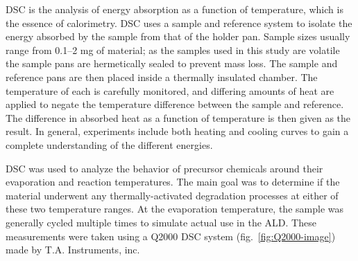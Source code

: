 DSC is the analysis of energy absorption as a function of temperature, which is the essence of calorimetry. DSC uses a sample and reference system to isolate the energy absorbed by the sample from that of the holder pan. Sample sizes usually range from 0.1--2 mg of material; as the samples used in this study are volatile the sample pans are hermetically sealed to prevent mass loss. The sample and reference pans are then placed inside a thermally insulated chamber. The temperature of each is carefully monitored, and differing amounts of heat are applied to negate the temperature difference between the sample and reference. The difference in absorbed heat as a function of temperature is then given as the result. In general, experiments include both heating and cooling curves to gain a complete understanding of the different energies. 
	
DSC was used to analyze the behavior of precursor chemicals around their evaporation and reaction temperatures. The main goal was to determine if the material underwent any thermally-activated degradation processes at either of these two temperature ranges. At the evaporation temperature, the sample was generally cycled multiple times to simulate actual use in the ALD. These measurements were taken using a Q2000 DSC system (fig.~\vref{fig:Q2000-image}) made by T.A. Instruments, inc.	
	

































	
	
	